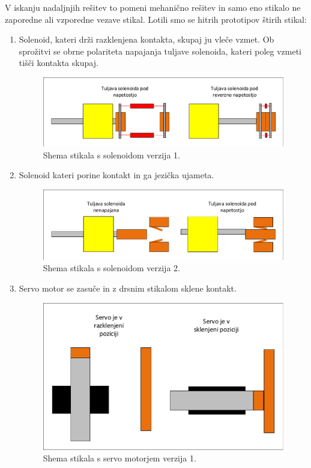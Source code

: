 \documentclass[a4paper,twoside,openright,12pt,Slovene]{book}
\begin{document}
    
    V iskanju nadaljnjih rešitev to pomeni mehanično rešitev in samo eno stikalo ne zaporedne ali vzporedne vezave stikal. Lotili smo se hitrih prototipov štirih stikal:
    \begin{enumerate}
   
        \item  Solenoid, kateri drži razklenjena kontakta, skupaj ju vleče vzmet. Ob sprožitvi se obrne polariteta napajanja tuljave solenoida, kateri poleg vzmeti tišči kontakta skupaj.
    \begin{figure}[H]
        \centering
        \includegraphics[width=1\columnwidth]{Sheme/StikaloSolenoidVerzija1.pdf}
        \caption{\label{/StikaloSolenoidVerzija1} Shema stikala s solenoidom verzija 1.}
    \end{figure}
    
    \item  Solenoid kateri porine kontakt in ga jezička ujameta.
    \begin{figure}[H]
        \centering
        \includegraphics[width=1\columnwidth]{Sheme/StikaloSolenoidVerzija2.pdf}
        \caption{\label{/StikaloSolenoidVerzija2} Shema stikala s solenoidom verzija 2.}
    \end{figure}
    
    \item  Servo motor se zasuče in z drsnim stikalom sklene kontakt.
    \begin{figure}[H]
        \centering
        \includegraphics[width=1\columnwidth]{Sheme/StikaloServoVerzija1.pdf}
        \caption{\label{StikaloServoVerzija1} Shema stikala s servo motorjem verzija 1.}
    \end{figure}
    

\end{enumerate}
\end{document}
